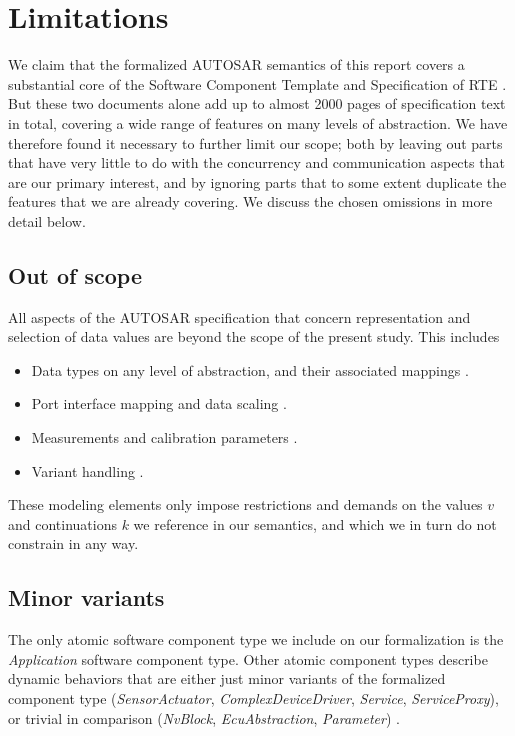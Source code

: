 \documentclass[10pt,conference]{IEEEtran}
\begin{document}
\section{Limitations} \label{sec:Lim}

We claim that the formalized AUTOSAR semantics of this report covers a substantial core of the Software Component Template and Specification of RTE \cite{AR:SWC, AR:RTE}. But these two documents alone add up to almost 2000 pages of specification text in total, covering a wide range of features on many levels of abstraction. We have therefore found it necessary to further limit our scope; both by leaving out parts that have very little to do with the concurrency and communication aspects that are our primary interest, and by ignoring parts that to some extent duplicate the features that we are already covering. We discuss the chosen omissions in more detail below.

\subsection{Out of scope}

All aspects of the AUTOSAR specification that concern representation and selection of data values are beyond the scope of the present study. This includes
\begin{itemize}
\item Data types on any level of abstraction, and their associated mappings \cite[ch.~5]{AR:SWC}.
\item Port interface mapping and data scaling \cite[ch.~4.3]{AR:SWC}.
\item Measurements and calibration parameters \cite[ch.~2.2]{AR:SWC}.
\item Variant handling \cite[ch.~2.4]{AR:SWC}.
\end{itemize}
These modeling elements only impose restrictions and demands on the values $v$ and continuations $k$ we reference in our semantics, and which we in turn do not constrain in any way.


\subsection{Minor variants}

The only atomic software component type we include on our formalization is the \emph{Application} software component type. Other atomic component types describe dynamic behaviors that are either just minor variants of the formalized component type (\emph{SensorActuator}, \emph{ComplexDeviceDriver}, \emph{Service}, \emph{ServiceProxy}), or trivial in comparison (\emph{NvBlock}, \emph{EcuAbstraction}, \emph{Parameter}) \cite[ch.~3.2.3]{AR:SWC}.
\end{document}

